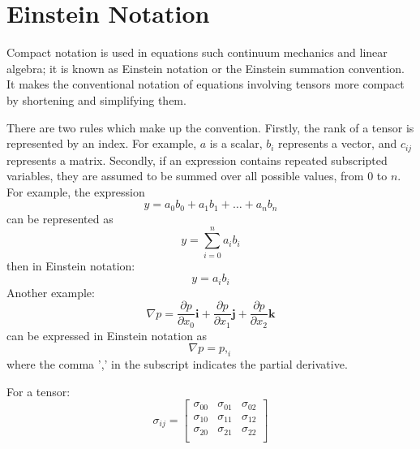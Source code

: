 
%
%
%

\chapter{Einstein Notation}
\label{EINSTEIN NOTATION}

Compact notation is used in equations such continuum mechanics and linear
algebra; it is known as Einstein notation or the Einstein summation convention.
It makes the conventional notation of equations involving tensors more compact
by shortening and simplifying them.

There are two rules which make up the convention.
Firstly, the rank of a tensor is represented by an index.
For example, $a$ is a scalar, $b_{i}$ represents a vector, and $c_{ij}$
represents a matrix.
Secondly, if an expression contains repeated subscripted variables, they are
assumed to be summed over all possible values, from $0$ to $n$.
For example, the expression
\begin{equation}
y = a_{0}b_{0} + a_{1}b_{1} + \ldots + a_{n}b_{n}
\label{NOTATION1}
\end{equation}
can be represented as
\begin{equation}
y = \sum_{i=0}^n  a_{i}b_{i}
\label{NOTATION2}
\end{equation}
then in Einstein notation:
\begin{equation}
y = a_{i}b_{i}
\label{NOTATION3}
\end{equation}
%
Another example:
\begin{equation}
\nabla p = \frac{\partial p}{\partial x_{0}}\textbf{i} + \frac{\partial p}{\partial x_{1}}\textbf{j} + \frac{\partial p}{\partial x_{2}}\textbf{k}
\label{NOTATION4}
\end{equation}
can be expressed in Einstein notation as
\begin{equation}
\nabla p = p,_{i}
\label{NOTATION5}
\end{equation}
where the comma ',' in the subscript indicates the partial derivative.

\noindent For a tensor:
\begin{equation}
\sigma _{ij}= 
\left[ \begin{array}{ccc}
\sigma_{00} & \sigma_{01} & \sigma_{02} \\
\sigma_{10} & \sigma_{11} & \sigma_{12} \\
\sigma_{20} & \sigma_{21} & \sigma_{22} \\
\end{array} \right]
\label{NOTATION6}
\end{equation}

